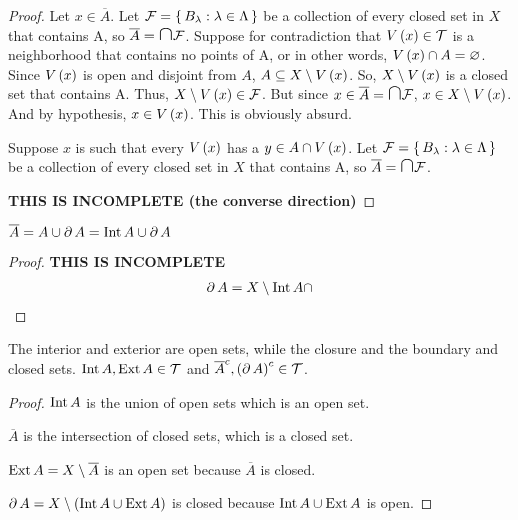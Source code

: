\documentclass{article}
\begin{document}
\begin{proof}
    \forwarddir Let $x \in \overline{A}$. Let $\mathcal{F} = \set{B_\lambda: \lambda \in \Lambda}$
    be a collection of every closed set in $X$ that contains A, so $\overline{A} = \medcap \mc F$.
    Suppose for contradiction that $V\left(x\right) \in \mathcal{T}$ is a neighborhood that contains
    no points of A, or in other words, $V\left(x\right) \cap A = \varnothing$. Since $V\left(x\right)$ is open
    and disjoint from $A$, $A \subseteq X\setminus V\left(x\right)$. So, $X \setminus V\left(x\right)$ is a
    closed set that contains A. Thus, $X \setminus V\left(x\right) \in \mathcal{F}$. But since $x \in \overline{A} = \medcap \mc F$, $x \in X \setminus V\left(x\right)$. And by hypothesis, $x \in V\left(x\right)$. This is obviously absurd.

    \conversedir Suppose $x$ is such that every $V\left(x\right)$ has a $y \in A \cap V\left(x\right)$.
    Let $\mathcal{F} = \set{B_\lambda: \lambda \in \Lambda}$
    be a collection of every closed set in $X$ that contains A, so $\overline{A} = \medcap \mc F$.

    \textbf{THIS IS INCOMPLETE (the converse direction)}
\end{proof}
\begin{proposition}
\label{book:prop:2.8e}
    $\overline{A} = A \cup \partial \, A = \textnormal{Int} \, A \cup \partial \, A$
\end{proposition}
\begin{proof}
    \textbf{THIS IS INCOMPLETE}
    \begin{align*}
        \partial \, A = X \setminus \textnormal{Int} \, A \cap  
    \end{align*}
\end{proof}
\begin{proposition}
\label{book:prop:2.8f}
    The interior and exterior are open sets, while the closure and the boundary and closed sets.
    $\textnormal{Int} \, A, \textnormal{Ext} \, A \in \mathcal{T}$ and $\overline{A}^c, \left(\partial \, A\right)^c \in \mathcal{T}$.
\end{proposition}
\begin{proof}
    $\textnormal{Int} \, A$ is the union of open sets which is an open set.

    $\overline{A}$ is the intersection of closed sets, which is a closed set.

    $\textnormal{Ext} \, A = X \setminus \overline{A}$ is an open set because $\overline{A}$ is closed.

    $\partial \, A = X \setminus \left(\textnormal{Int} \, A \cup \textnormal{Ext} \, A\right)$ is closed because
    $\textnormal{Int} \, A \cup \textnormal{Ext} \, A$ is open.
\end{proof}
\end{document}
